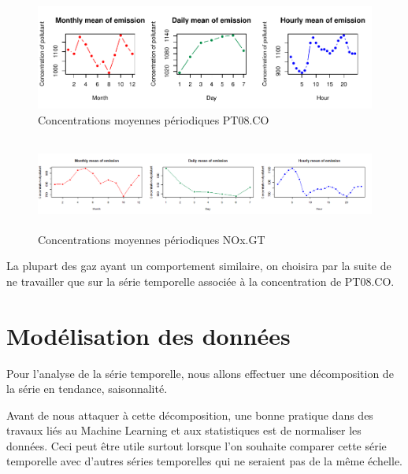 \documentclass[
]{article}
\newenvironment{Shaded}{\begin{snugshade}}{\end{snugshade}}
\newcommand{\AttributeTok}[1]{\textcolor[rgb]{0.77,0.63,0.00}{#1}}
\newcommand{\FunctionTok}[1]{\textcolor[rgb]{0.00,0.00,0.00}{#1}}
\newcommand{\NormalTok}[1]{#1}
\newcommand{\OtherTok}[1]{\textcolor[rgb]{0.56,0.35,0.01}{#1}}
\newcommand{\SpecialCharTok}[1]{\textcolor[rgb]{0.00,0.00,0.00}{#1}}
\begin{document}
\begin{figure}

{\centering \includegraphics{STA202_report_files/figure-latex/PT08.CO-1} 

}

\caption{\label{fig:PT08.CO} Concentrations moyennes périodiques PT08.CO}\label{fig:PT08.CO}
\end{figure}

\begin{figure}
  \centering
  \includegraphics[height=3cm]{Nox}
  \caption{Concentrations moyennes périodiques NOx.GT}
\end{figure}

La plupart des gaz ayant un comportement similaire, on choisira par la
suite de ne travailler que sur la série temporelle associée à la
concentration de PT08.CO.

\hypertarget{moduxe9lisation-des-donnuxe9es}{%
\section{Modélisation des
données}\label{moduxe9lisation-des-donnuxe9es}}

Pour l'analyse de la série temporelle, nous allons effectuer une
décomposition de la série en tendance, saisonnalité.

Avant de nous attaquer à cette décomposition, une bonne pratique dans
des travaux liés au Machine Learning et aux statistiques est de
normaliser les données. Ceci peut être utile surtout lorsque l'on
souhaite comparer cette série temporelle avec d'autres séries
temporelles qui ne seraient pas de la même échelle.

\begin{Shaded}
\end{Shaded}
\end{document}
